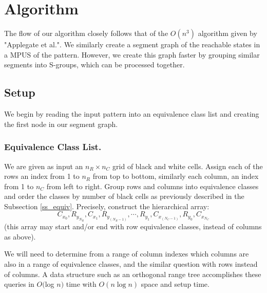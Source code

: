 \newcommand{\hs}{\hat{s}}
\newcommand{\hS}{\hat{S}}
\newcommand{\hU}{\hat{U}}

\section{Algorithm}
The flow of our algorithm closely follows that of the $O(n^3)$ algorithm given by "Applegate et al.".
We similarly create a segment graph of the reachable states in a MPUS of the pattern.
However, we create this graph faster by grouping similar segments into S-groups, which can be processed together.

\subsection{Setup}
We begin by reading the input pattern into an equivalence class list and creating the first node in our segment graph.

\subsubsection{Equivalence Class List.}
 We are given as input an $n_R \times n_C$ grid of black and white cells.
Assign each of the rows an index from 1 to $n_R$ from top to bottom, similarly each column, an index from 1 to $n_C$ from left to right.
 Group rows and columns into equivalence classes and order the classes by number of black cells as previously described in the Subsection \ref{ss_equiv}.
Precisely, construct the hierarchical array:
$$C_{x_{0}}, R_{y_{N_{R}}}, C_{x_{1}}, R_{y_{(N_{R}-1)}}, \cdots, R_{y_{1}}, C_{x_{(N_{C}-1)}}, R_{y_{0}}, C_{x_{N_{C}}}$$
(this array may start and/or end with row equivalence classes, instead of columns as above).

We will need to determine from a range of column indexes which columns are
also in a range of equivalence classes, and the similar question with
rows instead of columns.
A data structure such as an orthogonal range tree \cite{KOS2000}
accomplishes these queries in $O($log $n)$ time with $O(n \log n)$
space and setup time.

